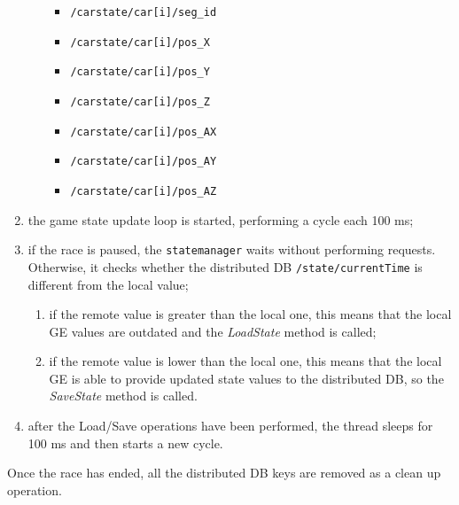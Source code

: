 \begin{enumerate}
\begin{enumerate}
\begin{itemize}
			\item \texttt{/carstate/car[i]/seg\_id}
			\item \texttt{/carstate/car[i]/pos\_X}
			\item \texttt{/carstate/car[i]/pos\_Y}
			\item \texttt{/carstate/car[i]/pos\_Z}
			\item \texttt{/carstate/car[i]/pos\_AX}
			\item \texttt{/carstate/car[i]/pos\_AY}
			\item \texttt{/carstate/car[i]/pos\_AZ}
		\end{itemize}
	\end{enumerate}
	\item the game state update loop is started, performing a cycle each 100 ms;
	\item if the race is paused, the \texttt{statemanager} waits without performing requests. Otherwise, it checks whether the distributed DB \texttt{/state/currentTime} is different from the local value;
	\begin{enumerate}
		\item if the remote value is greater than the local one, this means that the local GE values are outdated and the \textit{LoadState} method is called;
		\item if the remote value is lower than the local one, this means that the local GE is able to provide updated state values to the distributed DB, so the \textit{SaveState} method is called.
	\end{enumerate}
	\item after the Load/Save operations have been performed, the thread sleeps for 100 ms and then starts a new cycle.
\end{enumerate}
Once the race has ended, all the distributed DB keys are removed as a clean up operation.


